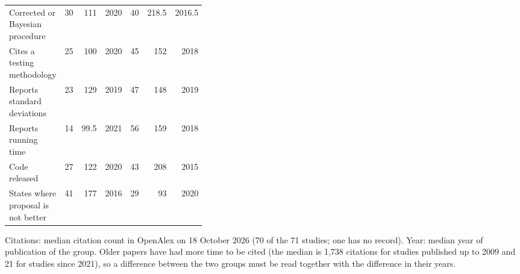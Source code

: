 \begin{table}[t]
\begin{tabular}{@{}>{\raggedright\arraybackslash}p{0.38\linewidth}rrrrrr@{}}
    Corrected or Bayesian procedure & 30 & 111 & 2020 & 40 & 218.5 & 2016.5\\
    Cites a testing methodology & 25 & 100 & 2020 & 45 & 152 & 2018\\
    Reports standard deviations & 23 & 129 & 2019 & 47 & 148 & 2019\\
    Reports running time & 14 & 99.5 & 2021 & 56 & 159 & 2018\\
    Code released & 27 & 122 & 2020 & 43 & 208 & 2015\\
    States where proposal is not better & 41 & 177 & 2016 & 29 & 93 & 2020\\
    \bottomrule
  \end{tabular}
  \par\smallskip\raggedright\scriptsize Citations: median citation count in OpenAlex on 18 October 2026 (70 of the 71 studies; one has no record). Year: median year of publication of the group. Older papers have had more time to be cited (the median is 1,738 citations for studies published up to 2009 and 21 for studies since 2021), so a difference between the two groups must be read together with the difference in their years.
\end{table}
